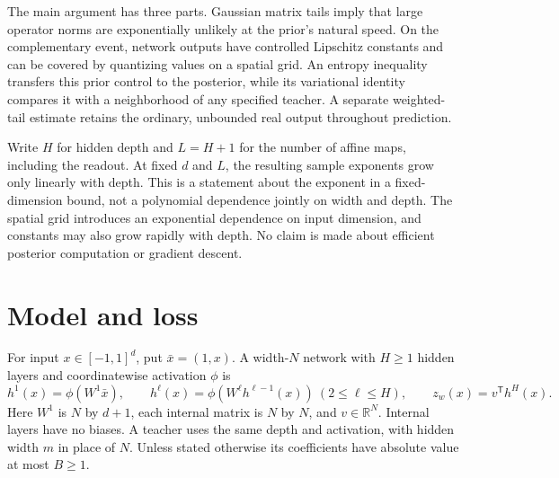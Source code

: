 \documentclass[11pt]{article}
\theoremstyle{definition}\newtheorem{definition}[theorem]{Definition}
\theoremstyle{remark}\newtheorem{remark}[theorem]{Remark}
\begin{document}
The main argument has three parts. Gaussian matrix tails imply that
large operator norms are exponentially unlikely at the prior's natural
speed. On the complementary event, network outputs have controlled
Lipschitz constants and can be covered by quantizing values on a spatial
grid. An entropy inequality transfers this prior control to the
posterior, while its variational identity compares it with a neighborhood
of any specified teacher. A separate weighted-tail estimate retains the
ordinary, unbounded real output throughout prediction.

Write $H$ for hidden depth and $L=H+1$ for the number of affine maps,
including the readout. At fixed $d$ and $L$, the resulting sample
exponents grow only linearly with depth. This is a statement about the
exponent in a fixed-dimension bound, not a polynomial dependence jointly
on width and depth. The spatial grid introduces an exponential dependence
on input dimension, and constants may also grow rapidly with depth.
No claim is made about efficient posterior computation or gradient descent.

\section{Model and loss}

For input $x\in[-1,1]^d$, put $\bar x=(1,x)$. A width-$N$ network
with $H\geq1$ hidden layers and coordinatewise activation $\phi$ is
\[
 h^1(x)=\phi(W^1\bar x),\qquad
 h^\ell(x)=\phi(W^\ell h^{\ell-1}(x))\ (2\leq\ell\leq H),
 \qquad z_w(x)=v^{\mathsf T}h^H(x).
\]
Here $W^1$ is $N$ by $d+1$, each internal matrix is $N$ by $N$,
and $v\in\mathbb R^N$. Internal layers have no biases. A teacher
uses the same depth and activation, with hidden width $m$ in place
of $N$. Unless stated otherwise its coefficients have absolute value
at most $B\geq1$.
\end{document}
